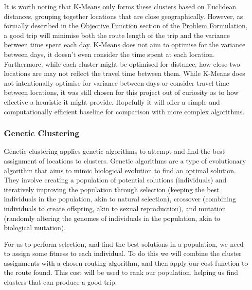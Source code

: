 \noindent
It is worth noting that K-Means only forms these clusters based on Euclidean distances, grouping together locations
that are close geographically.
However, as formally described in the \hyperref[subsec:objective-function]{Objective Function} section of the
\hyperref[sec:problem-formulation]{Problem Formulation}, a good trip will minimise both the route length of the trip
and the variance between time spent each day.
K-Means does not aim to optimise for the variance between days, it doesn't even consider the time spent at each
location.
Furthermore, while each cluster might be optimised for distance, how close two locations are may not reflect the travel
time between them.
While K-Means does not intentionally optimise for variance between days or consider travel time between locations, it
was still chosen for this project out of curiosity as to how effective a heuristic it might provide.
Hopefully it will offer a simple and computationally efficient baseline for comparison with more complex
algorithms.

\subsubsection{Genetic Clustering}
Genetic clustering applies genetic algorithms to attempt and find the best assignment of locations to clusters.
Genetic algorithms are a type of evolutionary algorithm that aims to mimic biological evolution to find an optimal
solution.
They involve creating a population of potential solutions (individuals) and iteratively improving the population
through selection (keeping the best individuals in the population, akin to natural selection), crossover (combining
individuals to create offspring, akin to sexual reproduction), and mutation (randomly altering the genomes
of individuals in the population, akin to biological mutation).

For us to perform selection, and find the best solutions in a population, we need to assign some fitness to each
individual.
To do this we will combine the cluster assignments with a chosen routing algorithm, and then apply our cost function
to the route found.
This cost will be used to rank our population, helping us find clusters that can produce a good trip.

